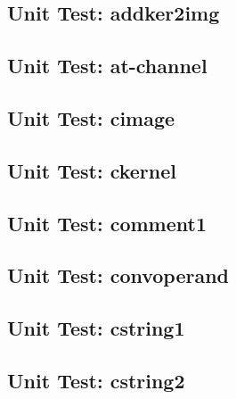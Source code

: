 \subsection*{Unit Test: addker2img}

 \clearpage
\subsection*{Unit Test: at-channel}

 \clearpage
\subsection*{Unit Test: cimage}

 \clearpage
\subsection*{Unit Test: ckernel}

 \clearpage
\subsection*{Unit Test: comment1}

 \clearpage
\subsection*{Unit Test: convoperand}

 \clearpage
\subsection*{Unit Test: cstring1}

 \clearpage
\subsection*{Unit Test: cstring2}

 \clearpage

